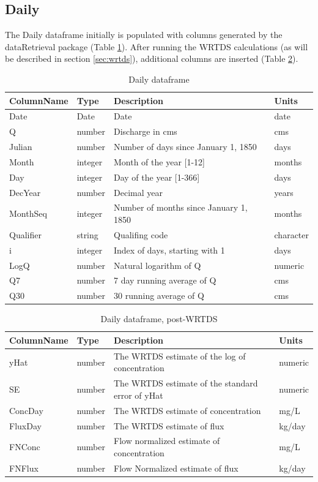 \documentclass[a4paper,11pt]{article}\usepackage[]{graphicx}\usepackage[]{color}
\begin{document}
\subsection{Daily}
\label{sec:dataframesDaily}
The Daily dataframe initially is populated with columns generated by the dataRetrieval package (Table \ref{table:Daily1}).  After running the WRTDS calculations (as will be described in section \ref{sec:wrtds}), additional columns are inserted (Table \ref{table:Daily2}).

\begin{table}[!ht]
\centering
\caption{Daily dataframe} 
\label{table:Daily1}
\begin{tabular}{llll}
  \hline
ColumnName & Type & Description & Units \\ 
  \hline
  Date & Date & Date & date \\ 
  Q & number & Discharge in cms & cms \\ 
  Julian & number & Number of days since January 1, 1850 & days \\ 
  Month & integer & Month of the year [1-12] & months \\ 
  Day & integer & Day of the year [1-366] & days \\ 
  DecYear & number & Decimal year & years \\ 
  MonthSeq & integer & Number of months since January 1, 1850 & months \\ 
  Qualifier & string & Qualifing code & character \\ 
  i & integer & Index of days, starting with 1 & days \\ 
  LogQ & number & Natural logarithm of Q & numeric \\ 
  Q7 & number & 7 day running average of Q & cms \\ 
  Q30 & number & 30 running average of Q & cms \\ 
   \hline
\end{tabular}
\end{table}

\begin{table}[!ht]
\centering
\caption{Daily dataframe, post-WRTDS} 
\label{table:Daily2}
\begin{tabular}{llll}
  \hline
ColumnName & Type & Description & Units \\ 
  \hline
yHat & number & The WRTDS estimate of the log of concentration & numeric \\ 
  SE & number & The WRTDS estimate of the standard error of yHat & numeric \\ 
  ConcDay & number & The WRTDS estimate of concentration & mg/L \\ 
  FluxDay & number & The WRTDS estimate of flux & kg/day \\ 
  FNConc & number & Flow normalized estimate of concentration & mg/L \\ 
  FNFlux & number & Flow Normalized estimate of flux & kg/day \\ 
   \hline
\end{tabular}
\end{table}
\end{document}

